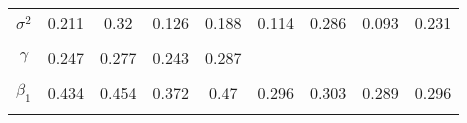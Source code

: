 \begin{footnotesize}
\begin{singlespace}
\begin{tabular}{ccccccccc}
$ \sigma^{2} $ & 0.211 & 0.32 & 0.126 & 0.188 & 0.114 & 0.286 & 0.093 & 0.231 \\ 
 & \begin{tiny} [0.194,0.23] \end{tiny}  & \begin{tiny} [0.287,0.353] \end{tiny}  & \begin{tiny} [0.109,0.148] \end{tiny}  & \begin{tiny} [0.157,0.226] \end{tiny}  & \begin{tiny} [0.096,0.136] \end{tiny}  & \begin{tiny} [0.252,0.323] \end{tiny}  & \begin{tiny} [0.077,0.107] \end{tiny}  & \begin{tiny} [0.203,0.259] \end{tiny}  \\ 
$\gamma$ & 0.247 & 0.277 & 0.243 & 0.287 &  &  &  &  \\ 
 & \begin{tiny} [0.238,0.255] \end{tiny}  & \begin{tiny} [0.268,0.284] \end{tiny}  & \begin{tiny} [0.233,0.252] \end{tiny}  & \begin{tiny} [0.279,0.295] \end{tiny}  &  &  &  &  \\ 
$ \beta_{1} $ & 0.434 & 0.454 & 0.372 & 0.47 & 0.296 & 0.303 & 0.289 & 0.296 \\ 
 & \begin{tiny} [0.327,0.543] \end{tiny}  & \begin{tiny} [0.342,0.569] \end{tiny}  & \begin{tiny} [0.272,0.477] \end{tiny}  & \begin{tiny} [0.343,0.596] \end{tiny}  & \begin{tiny} [0.158,0.436] \end{tiny}  & \begin{tiny} [0.187,0.418] \end{tiny}  & \begin{tiny} [0.151,0.432] \end{tiny}  & \begin{tiny} [0.182,0.41] \end{tiny}  \\ 

\end{tabular}
\end{singlespace}
\end{footnotesize}
